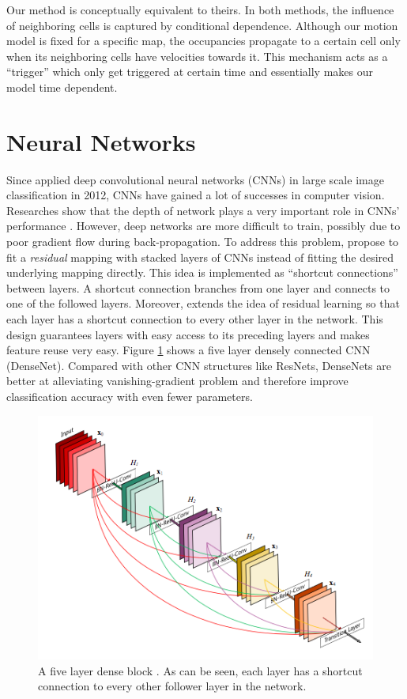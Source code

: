 Our method is conceptually equivalent to theirs. In both methods, the influence of neighboring cells is captured by conditional dependence. Although our motion model is fixed for a specific map, the occupancies propagate to a certain cell only when its neighboring cells have velocities towards it. This mechanism acts as a ``trigger'' which only get triggered at certain time and essentially makes our model time dependent.


\section{Neural Networks} \label{lr:network}

Since \citet{krizhevsky2012imagenet} applied deep convolutional neural networks (CNNs) in large scale image classification in 2012, CNNs have gained a lot of successes in computer vision. Researches show that the depth of network plays a very important role in CNNs' performance \citep{simonyan2014very}. However, deep networks are more difficult to train, possibly due to poor gradient flow during back-propagation. To address this problem, \citet{he2016deep} propose to fit a \textit{residual} mapping with stacked layers of CNNs instead of fitting the desired underlying mapping directly. This idea is implemented as ``shortcut connections'' between layers. A shortcut connection branches from one layer and connects to one of the followed layers. Moreover, \citet{huang2016densely} extends the idea of residual learning so that each layer has a shortcut connection to every other layer in the network. This design guarantees layers with easy access to its preceding layers and makes feature reuse very easy. Figure \ref{fig:dense_net} shows a five layer densely connected CNN (DenseNet).  Compared with other CNN structures like ResNets, DenseNets are better at alleviating vanishing-gradient problem and therefore improve classification accuracy with even fewer parameters. 

\begin{figure}[H]
  \centering
    \includegraphics[width=.6\textwidth]{figures/denseNet.png}
    \caption[A five layer dense block.]{A five layer dense block \citet{huang2016densely}. As can be seen, each layer has a shortcut connection to every other follower layer in the network.}
    \label{fig:dense_net}
\end{figure} 


